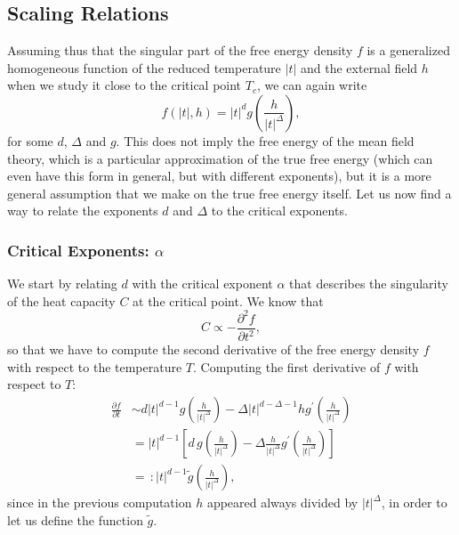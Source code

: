 \subsection{Scaling Relations}

Assuming thus that the singular part of the free energy density \(f\) is a generalized homogeneous function of the reduced temperature \(\vert t \vert\) and the external field \(h\) when we study it close to the critical point \(T_c\), we can again write
\[
    f(\vert t \vert, h) = \vert t \vert^{d} g\left(\frac{h}{\vert t \vert^{\Delta}}\right),
\]
for some \(d\), \(\Delta\) and \(g\). This does not imply the free energy of the mean field theory, which is a particular approximation of the true free energy (which can even have this form in general, but with different exponents), but it is a more general assumption that we make on the true free energy itself. Let us now find a way to relate the exponents \(d\) and \(\Delta\) to the critical exponents.

\subsubsection{Critical Exponents: \(\alpha\)}

We start by relating \(d\) with the critical exponent \(\alpha\) that describes the singularity of the heat capacity \(C\) at the critical point. We know that
\[
    C \propto - \frac{\partial^2 f}{\partial t^2},
\]
so that we have to compute the second derivative of the free energy density \(f\) with respect to the temperature \(T\). Computing the first derivative of \(f\) with respect to \(T\):
\[
    \begin{aligned}
        \frac{\partial f}{\partial t} & \sim d \vert t \vert^{d-1} g\left(\frac{h}{\vert t \vert^{\Delta}}\right) - \Delta \vert t \vert^{d-\Delta-1} h g^{\prime}\left(\frac{h}{\vert t \vert^{\Delta}}\right)                  \\
                                      & = \vert t \vert^{d-1} \left[ d\,g\left(\frac{h}{\vert t \vert^{\Delta}}\right) - \Delta \frac{h}{\vert t \vert^{\Delta}} g^{\prime}\left(\frac{h}{\vert t \vert^{\Delta}}\right) \right] \\
                                      & = \, : \vert t \vert^{d-1} \tilde{g}\left(\frac{h}{\vert t \vert^{\Delta}}\right),
    \end{aligned}
\]
since in the previous computation \(h\) appeared always divided by \(\vert t \vert^{\Delta}\), in order to let us define the function \(\tilde{g}\).

